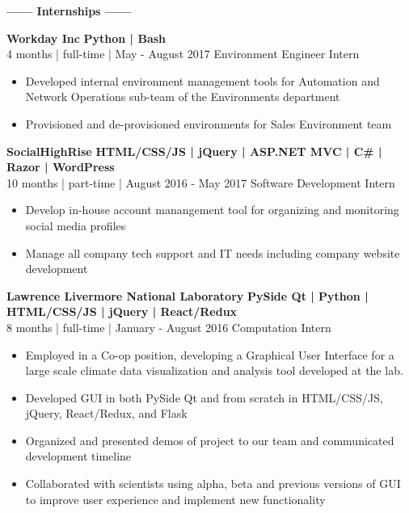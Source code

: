 \documentclass[12pt]{article}
\begin{document}
    \color{secondary}
    \center
    \begin{center}
    \textbf{\Large------ Internships ------}\\
    \end{center}
    \begin{footnotesize}
    \flushleft
    \textbf{\color{primary}\large Workday Inc} \hfill \textbf{\color{Cerulean}Python | Bash}\\ 
    {\color{primary}4 months | full-time | May - August 2017} \hfill {\color{Cerulean} Environment Engineer Intern}
    \vspace{-2mm}
    \begin{itemize}
        \setlength{\itemsep}{0pt}
        \item Developed internal environment management tools for Automation and Network Operations sub-team of the Environments department
        \item Provisioned and de-provisioned environments for Sales Environment team
    \end{itemize}
    \textbf{\color{primary}\large SocialHighRise} \hfill  \textbf{\color{Cerulean}HTML/CSS/JS | jQuery | ASP.NET MVC | C\# | Razor | WordPress } \\ 
    {\color{primary}10 months | part-time | August 2016 - May 2017} \hfill {\color{Cerulean} Software Development Intern}
    \vspace{-2mm}
    \begin{itemize}
        \setlength{\itemsep}{0pt}
        \item Develop in-house account manangement tool for organizing and monitoring social media profiles
        \item Manage all company tech support and IT needs including company website development
    \end{itemize}
    \textbf{\color{primary}\large Lawrence Livermore National Laboratory} \hfill \textbf{\color{Cerulean}PySide Qt | Python | HTML/CSS/JS | jQuery | React/Redux}\\
    {\color{primary}8 months | full-time | January - August 2016} \hfill {\color{Cerulean} Computation Intern}
    \vspace{-2mm}
    \begin{itemize}
        \setlength{\itemsep}{0pt}
        \item Employed in a Co-op position, developing a Graphical User Interface for a large scale climate data visualization and analysis tool developed at the lab.
        \item Developed GUI in both PySide Qt and from scratch in HTML/CSS/JS, jQuery, React/Redux, and Flask

        \item Organized and presented demos of project to our team and communicated development timeline
        \item Collaborated with scientists using alpha, beta and previous versions of GUI to improve user experience and implement new functionality
    \end{itemize}

    \end{footnotesize}
    
\end{document}
